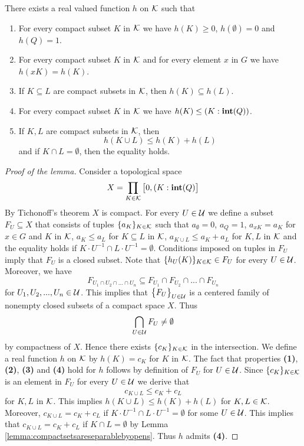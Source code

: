 \begin{lemma}\label{lemma:definitiononcompactsets}
There exists a real valued function $h$ on ${\mathcal K}$ such that
\begin{enumerate}[label=\emph{\textbf{(\arabic*)}}, leftmargin=1.5em]
\item For every compact subset $K$ in ${\mathcal K}$ we have $h(K)\geq 0$, $h(\emptyset) = 0$ and $h(Q)=1$.
\item For every compact subset $K$ in ${\mathcal K}$ and for every element $x$ in $G$ we have $h(xK) = h(K)$.
\item If $K\subseteq L$ are compact subsets in ${\mathcal K}$, then $h(K)\subseteq h(L)$.
\item For every compact subset $K$ in ${\mathcal K}$ we have $h(K) \leq \left(K:\mathbf{int}(Q)\right)$.
\item If $K, L$ are compact subsets in ${\mathcal K}$, then
$$h(K\cup L) \leq h(K) + h(L)$$
and if $K \cap L = \emptyset$, then the equality holds.
\end{enumerate}
\end{lemma}
\begin{proof}[Proof of the lemma]
Consider a topological space
$$X = \prod_{K\in {\mathcal K}}\big[0,(K:\mathbf{int}(Q)\big]$$
By Tichonoff's theorem $X$ is compact. For every $U\in {\mathcal U}$ we define a subset $F_U\subseteq X$ that consists of tuples $\{a_K\}_{K\in {\mathcal K}}$ such that $a_{\emptyset} = 0$, $a_{Q}=1$, $a_{xK}= a_K$ for $x\in G$ and $K$ in ${\mathcal K}$, $a_K\leq a_L$ for $K\subseteq L$ in ${\mathcal K}$, $a_{K\cup L}\leq a_K + a_L$ for $K,L$ in ${\mathcal K}$ and the equality holds if $K\cdot U^{-1} \cap L\cdot U^{-1} = \emptyset$. Conditions imposed on tuples in $F_U$ imply that $F_U$ is a closed subset. Note that $\{h_U(K)\}_{K\in {\mathcal K}}\in F_U$ for every $U\in {\mathcal U}$. Moreover, we have
$$F_{U_1\cap U_2\cap ...\cap U_n} \subseteq F_{U_1}\cap F_{U_2}\cap ...\cap F_{U_n}$$
for $U_1, U_2,...,U_n\in {\mathcal U}$. This implies that $\big\{F_U\big\}_{U\in {\mathcal U}}$ is a centered family of nonempty closed subsets of a compact space $X$. Thus
$$\bigcap_{U\in {\mathcal U}}F_U \neq \emptyset$$
by compactness of $X$. Hence there exists $\{c_K\}_{K\in {\mathcal K}}$ in the intersection. We define a real function $h$ on ${\mathcal K}$ by $h(K) = c_K$ for $K$ in ${\mathcal K}$. The fact that properties \textbf{(1)}, \textbf{(2)}, \textbf{(3)} and \textbf{(4)} hold for $h$ follows by definition of $F_U$ for $U\in {\mathcal U}$. Since $\{c_K\}_{K\in {\mathcal K}}$ is an element in $F_U$ for every $U\in {\mathcal U}$ we derive that
$$c_{K\cup L} \leq c_K+c_L$$
for $K, L$ in ${\mathcal K}$. This implies $h(K\cup L) \leq h(K) + h(L)$ for $K, L\in {\mathcal K}$. Moreover, $c_{K\cup L} = c_K + c_L$ if $K\cdot U^{-1}\cap L\cdot U^{-1} = \emptyset$ for some $U\in {\mathcal U}$. This implies that $c_{K\cup L} = c_K + c_L$ if $K \cap L = \emptyset$ by Lemma \ref{lemma:compactsetsareseparablebyopens}. Thus $h$ admits \textbf{(4)}.
\end{proof}

